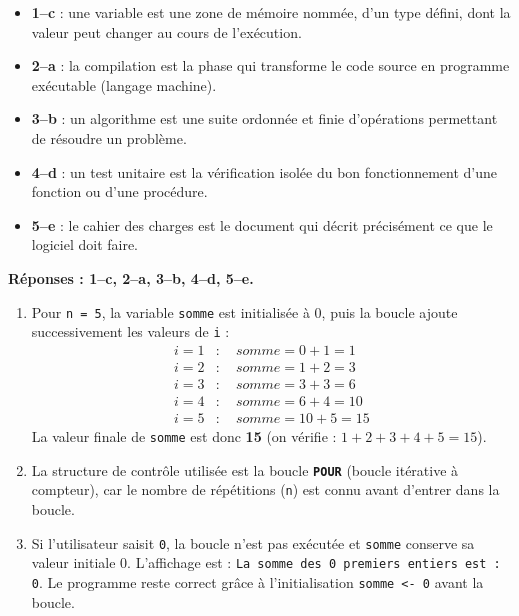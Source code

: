 \documentclass[11pt]{article}
\begin{document}
\begin{corrige}
\begin{itemize}
    \item \textbf{1--c} : une variable est une zone de mémoire nommée, d'un type défini, dont la valeur peut changer au cours de l'exécution.
    \item \textbf{2--a} : la compilation est la phase qui transforme le code source en programme exécutable (langage machine).
    \item \textbf{3--b} : un algorithme est une suite ordonnée et finie d'opérations permettant de résoudre un problème.
    \item \textbf{4--d} : un test unitaire est la vérification isolée du bon fonctionnement d'une fonction ou d'une procédure.
    \item \textbf{5--e} : le cahier des charges est le document qui décrit précisément ce que le logiciel doit faire.
\end{itemize}
\textbf{Réponses : 1--c, 2--a, 3--b, 4--d, 5--e.}
\end{corrige}

\begin{corrige}
\begin{enumerate}
    \item Pour \texttt{n = 5}, la variable \texttt{somme} est initialisée à 0, puis la boucle ajoute successivement les valeurs de \texttt{i} :
    \begin{align*}
        i = 1 &: \quad somme = 0 + 1 = 1\\
        i = 2 &: \quad somme = 1 + 2 = 3\\
        i = 3 &: \quad somme = 3 + 3 = 6\\
        i = 4 &: \quad somme = 6 + 4 = 10\\
        i = 5 &: \quad somme = 10 + 5 = 15
    \end{align*}
    La valeur finale de \texttt{somme} est donc \textbf{15} (on vérifie : $1+2+3+4+5 = 15$).
    \item La structure de contrôle utilisée est la boucle \textbf{\texttt{POUR}} (boucle itérative à compteur), car le nombre de répétitions (\texttt{n}) est connu avant d'entrer dans la boucle.
    \item Si l'utilisateur saisit \texttt{0}, la boucle n'est pas exécutée et \texttt{somme} conserve sa valeur initiale 0. L'affichage est : \texttt{La somme des 0 premiers entiers est : 0}. Le programme reste correct grâce à l'initialisation \texttt{somme <- 0} avant la boucle.
\end{enumerate}
\end{corrige}
\end{document}
